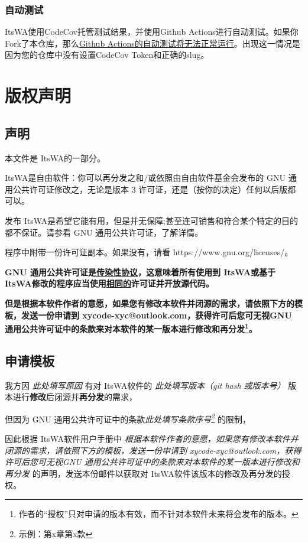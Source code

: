 \documentclass[UTF8]{ctexart}
\newcommand{\itswa}{ItsWA}
\begin{document}
            \subsubsection{自动测试}
                \itswa 使用CodeCov托管测试结果，并使用Github Actions进行自动测试。如果你Fork了本仓库，那么\uline{Github Actions的自动测试将无法正常运行}。出现这一情况是因为您的仓库中没有设置CodeCov Token和正确的slug。
    
    \section{版权声明}
        \subsection{声明}
            本文件是 \itswa 的一部分。

            \itswa 是自由软件：你可以再分发之和/或依照由自由软件基金会发布的 GNU 通用公共许可证修改之，无论是版本 3 许可证，还是（按你的决定）任何以后版都可以。
            
            发布 \itswa 是希望它能有用，但是并无保障;甚至连可销售和符合某个特定的目的都不保证。请参看 GNU 通用公共许可证，了解详情。
            
            程序中附带一份许可证副本。如果没有，请看 https://www.gnu.org/licenses/。

            \textbf{GNU 通用公共许可证是\uline{传染性协议}，这意味着所有使用到 \itswa 或基于 \itswa 修改的程序应当使用\uline{相同的}许可证并开放源代码。}

            \textbf{但是根据本软件作者的意愿，如果您有修改本软件并闭源的需求，请依照下方的模板，发送一份申请到 xycode-xyc@outlook.com，获得许可后您可无视GNU 通用公共许可证中的条款来对本软件的某一版本进行修改和再分发\footnote{作者的“授权”只对申请的版本有效，而不针对本软件未来将会发布的版本。}。}

        \subsection{申请模板}
            我方因 \textit{此处填写原因} 有对 \itswa 软件的 \textit{此处填写版本（git hash 或版本号）} 版本进行\textbf{修改}后闭源并\textbf{再分发}的需求，

            但因为 GNU 通用公共许可证中的条款\textit{此处填写条款序号\footnote{示例：第x章第x款}} 的限制，

            因此根据 \itswa 软件用户手册中 \textit{根据本软件作者的意愿，如果您有修改本软件并闭源的需求，请依照下方的模板，发送一份申请到 xycode-xyc@outlook.com，获得许可后您可无视GNU 通用公共许可证中的条款来对本软件的某一版本进行修改和再分发} 的声明，发送本份邮件以获取对 \itswa 软件该版本的修改及再分发的授权。
\end{document}
